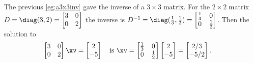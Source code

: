 \begin{example} \label{eg:}
The previous \autoref{eg:a3x3inv} gave the inverse of a \(3\times3\) matrix.  
For the \(2\times2\) matrix \(D=\diag(3,2)=\begin{bmatrix} 3&0\\0&2 \end{bmatrix}\) the inverse is \(D^{-1}=\diag(\frac13,\frac12)=\begin{bmatrix} \frac13&0\\0&\frac12 \end{bmatrix}\).  Then the solution to
\begin{equation*}
\begin{bmatrix} 3&0\\0&2 \end{bmatrix}\xv
=\begin{bmatrix} 2\\-5 \end{bmatrix}
\quad\text{is }\xv=\begin{bmatrix} \frac13&0\\0&\frac12 \end{bmatrix}
\begin{bmatrix} 2\\-5 \end{bmatrix}=\begin{bmatrix} 2/3\\-5/2 \end{bmatrix}.
\end{equation*}
\end{example}


